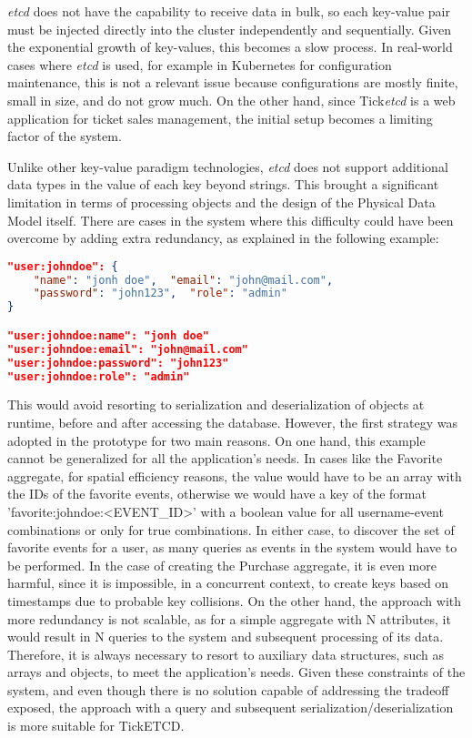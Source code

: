 \documentclass[screen,review]{acmart}
\begin{document}
\textit{etcd} does not have the capability to receive data in bulk, so each key-value pair must be injected directly into the cluster independently and sequentially. Given the exponential growth of key-values, this becomes a slow process. In real-world cases where \textit{etcd} is used, for example in Kubernetes for configuration maintenance, this is not a relevant issue because configurations are mostly finite, small in size, and do not grow much. On the other hand, since Tick\textit{etcd} is a web application for ticket sales management, the initial setup becomes a limiting factor of the system.

Unlike other key-value paradigm technologies, \textit{etcd} does not support additional data types in the value of each key beyond strings. This brought a significant limitation in terms of processing objects and the design of the Physical Data Model itself. There are cases in the system where this difficulty could have been overcome by adding extra redundancy, as explained in the following example:

\begin{lstlisting}[language=json]
"user:johndoe": { 
    "name": "jonh doe",  "email": "john@mail.com", 
    "password": "john123",  "role": "admin"
}

"user:johndoe:name": "jonh doe"
"user:johndoe:email": "john@mail.com"
"user:johndoe:password": "john123"
"user:johndoe:role": "admin"
\end{lstlisting}

This would avoid resorting to serialization and deserialization of objects at runtime, before and after accessing the database. However, the first strategy was adopted in the prototype for two main reasons. On one hand, this example cannot be generalized for all the application's needs. In cases like the Favorite aggregate, for spatial efficiency reasons, the value would have to be an array with the IDs of the favorite events, otherwise we would have a key of the format 'favorite:johndoe:<EVENT\_ID>' with a boolean value for all username-event combinations or only for true combinations. In either case, to discover the set of favorite events for a user, as many queries as events in the system would have to be performed. In the case of creating the Purchase aggregate, it is even more harmful, since it is impossible, in a concurrent context, to create keys based on timestamps due to probable key collisions. On the other hand, the approach with more redundancy is not scalable, as for a simple aggregate with N attributes, it would result in N queries to the system and subsequent processing of its data. Therefore, it is always necessary to resort to auxiliary data structures, such as arrays and objects, to meet the application's needs. Given these constraints of the system, and even though there is no solution capable of addressing the tradeoff exposed, the approach with a query and subsequent serialization/deserialization is more suitable for TickETCD.
\end{document}
